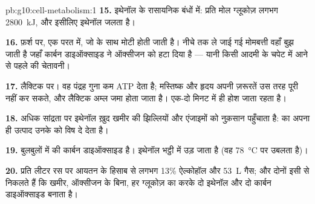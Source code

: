 \begin{solution}{pb:g10:cell-metabolism:1}
\textbf{15.} इथेनॉल के रासायनिक बंधों में: प्रति मोल ग्लूकोज़ लगभग
\qty{2800}{kJ}, और इसीलिए इथेनॉल जलता है।

\textbf{16.} फ़र्श पर, एक परत में, जो  के साथ मोटी होती जाती है।
नीचे तक ले जाई गई मोमबत्ती वहाँ बुझ जाती है जहाँ कार्बन डाइऑक्साइड ने
ऑक्सीजन को हटा दिया है --- यानी किसी आदमी के चपेट में आने से पहले की
चेतावनी।

\textbf{17.} लैक्टिक  पर। वह पंद्रह गुना कम ATP देता है; मस्तिष्क
और हृदय अपनी ज़रूरतें उस तरह पूरी नहीं कर सकते, और लैक्टिक अम्ल जमा होता
जाता है। एक-दो मिनट में ही होश जाता रहता है।

\textbf{18.} अधिक सांद्रता पर इथेनॉल ख़ुद खमीर की झिल्लियों और एंजाइमों
को नुक़सान पहुँचाता है:  का अपना ही उत्पाद उनके  को विष दे
देता है।

\textbf{19.} बुलबुलों में  की कार्बन डाइऑक्साइड है। इथेनॉल भट्ठी
में उड़ जाता है (वह \qty{78}{\celsius} पर उबलता है)।

\textbf{20.} प्रति लीटर रस पर आयतन के हिसाब से लगभग 13\% ऐल्कोहॉल और
\qty{53}{L} गैस; और दोनों इसी से निकलते हैं कि खमीर, ऑक्सीजन के बिना, हर
ग्लूकोज़ का  करके दो इथेनॉल और दो कार्बन डाइऑक्साइड बनाता है।
\end{solution}
